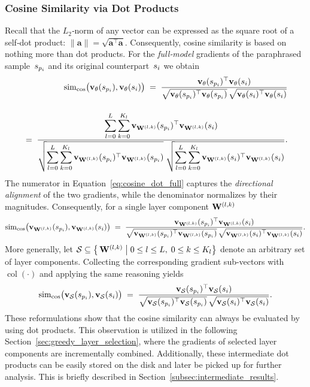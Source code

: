 \subsubsection{Cosine Similarity via Dot Products}
Recall that the $L_2$‑norm of any vector can be expressed as the square root of a self‑dot product:
$\|\mathbf{a}\|=\sqrt{\mathbf{a}^{\top}\mathbf{a}}$.
Consequently, cosine similarity is based on nothing more than dot products. For the \emph{full‑model} gradients of the paraphrased sample~$s_{p_i}$ and its original counterpart~$s_i$ we obtain
\begin{equation}
\begin{split}
      \simcos\bigl(\vXspi,\vXsi\bigr)
  \;=\;
  \frac{\vXspi^{\top}\vXsi}
       {\sqrt{\vXspi^{\top}\vXspi}\,
        \sqrt{\vXsi^{\top}\vXsi}}\\[12pt]
  \;=\;
  \frac{\displaystyle
        \sum_{l=0}^{L}\sum_{k=0}^{K_l}
        \vXspi[\Wlk]^{\top}\vXsi[\Wlk]}
       {\displaystyle
        \sqrt{\sum_{l=0}^{L}\sum_{k=0}^{K_l}
               \vXspi[\Wlk]^{\top}\vXspi[\Wlk]}\;
        \sqrt{\sum_{l=0}^{L}\sum_{k=0}^{K_l}
               \vXsi[\Wlk]^{\top}\vXsi[\Wlk]}}.
\end{split}
\label{eq:cosine_dot_full}
\end{equation}
The numerator in Equation~\ref{eq:cosine_dot_full} captures the \emph{directional alignment} of the two gradients, while the denominator normalizes by their magnitudes. Consequently, for a single layer component $\mathbf{W}^{(l,k)}$
\begin{equation}
  \simcos\bigl(\vXspi[\Wlk],\vXsi[\Wlk]\bigr)
  \;=\;
  \frac{\vXspi[\Wlk]^{\top}\vXsi[\Wlk]}
       {\sqrt{\vXspi[\Wlk]^{\top}\vXspi[\Wlk]}\,
        \sqrt{\vXsi[\Wlk]^{\top}\vXsi[\Wlk]}}.
  \label{eq:cosine_dot_layer}
\end{equation}
More generally, let $\mathcal{S}\subseteq \bigl\{\,\mathbf{W}^{(l,k)} \;\big|\;0\le l\le L,\;0\le k\le K_l\bigr\}$ denote an arbitrary set of layer components. Collecting the corresponding gradient sub-vectors with
$\operatorname{col}(\cdot)$ and applying the same reasoning yields
\begin{equation}
  \simcos\bigl(\vXspi[\mathcal{S}],\vXsi[\mathcal{S}]\bigr)
  \;=\;
  \frac{\vXspi[\mathcal{S}]^{\top}\vXsi[\mathcal{S}]}
       {\sqrt{\vXspi[\mathcal{S}]^{\top}\vXspi[\mathcal{S}]}\,
        \sqrt{\vXsi[\mathcal{S}]^{\top}\vXsi[\mathcal{S}]}}.
  \label{eq:cosine_dot_subset}
\end{equation}
These reformulations show that the cosine similarity can always be evaluated by using dot products. This observation is utilized in the following Section~\ref{sec:greedy_layer_selection}, where the gradients of selected layer components are incrementally combined. Additionally, these intermediate dot products can be easily stored on the disk and later be picked up for further analysis. This is briefly described in Section~\ref{subsec:intermediate_results}.

